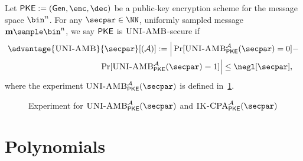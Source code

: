 \begin{definition}
\label{def:ambiguous}
Let $\pke := (\gen, \enc, \dec)$ be a public-key encryption scheme for the message
space $\bin^n$. For any $\secpar\in\NN$, uniformly sampled message $\mn\sample\bin^n$, we say $\mathsf{PKE}$ is $\textsc{UNI-AMB}$-secure if
\begin{align*}
    \advantage{\uniamb}{\secpar}[(\Ac)] :=
    \Big|\Pr[\uniamb^\Ac_\pke(\secpar)= 0] &-\\\Pr[\uniamb^\Ac_\pke(\secpar)= 1] \Big|
    \le \negl[\secpar],
\end{align*}
where the experiment $\uniamb^\Ac_\pke(\secpar)$ is defined in~\cref{fig:experiment_ambiguous}.
\begin{figure}[!t]
\centering
    \begin{pchstack}[boxed]

    \pchspace
    \end{pchstack}
    \caption{Experiment for $\uniamb^\Ac_\pke(\secpar)$ and $\ikcpa^\Ac_\pke(\secpar)$}
    \label{fig:experiment_ambiguous}
\end{figure}

\end{definition}



\section{Polynomials}

